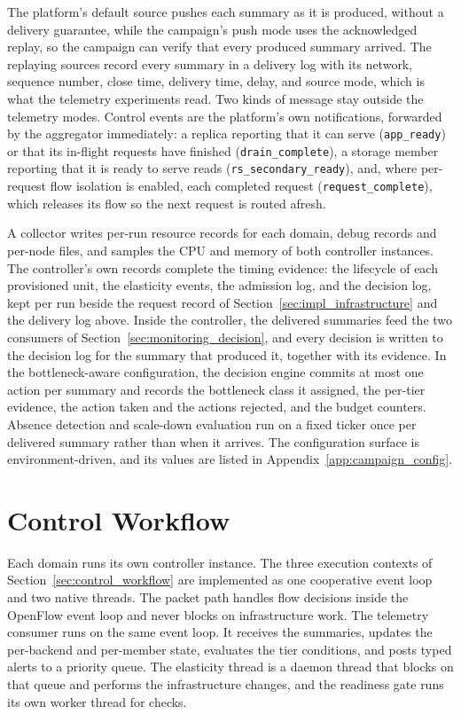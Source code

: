﻿\documentclass[12pt,reqno,twoside]{amsbook}
\begin{document}
The platform's default source pushes each summary as it is produced, without a
delivery guarantee, while the campaign's push mode uses the acknowledged replay,
so the campaign can verify that every produced summary arrived. The replaying
sources record every summary in a delivery log with its network, sequence number,
close time, delivery time, delay, and source mode, which is what the telemetry
experiments read. Two kinds of message stay outside the
telemetry modes. Control events are the platform's own notifications,
forwarded by the aggregator immediately: a replica reporting that it can
serve (\texttt{app\_ready}) or that its in-flight requests have finished
(\texttt{drain\_complete}), a storage member reporting that it is ready to
serve reads (\texttt{rs\_secondary\_ready}), and, where per-request flow
isolation is enabled, each completed request (\texttt{request\_complete}),
which releases its flow so the next request is routed afresh.

A collector writes per-run resource records for each domain, debug records and
per-node files, and samples the CPU and memory of both controller instances. The
controller's own records complete the timing evidence: the lifecycle of each
provisioned unit, the elasticity events, the admission log, and the decision log,
kept per run beside the request record of
Section~\ref{sec:impl_infrastructure} and the delivery log above. Inside the controller, the delivered
summaries feed the two consumers of
Section~\ref{sec:monitoring_decision}, and
every decision is written to the decision log for the summary that produced
it, together with its evidence. In the
bottleneck-aware configuration, the decision engine commits at most one
action per summary and records the bottleneck class it assigned, the
per-tier evidence, the action taken and the actions rejected, and the budget
counters. Absence
detection and scale-down evaluation run on a fixed ticker once per
delivered summary rather than when it arrives. The configuration surface
is environment-driven, and its values are listed in
Appendix~\ref{app:campaign_config}.

\section{Control Workflow}\label{sec:impl_control}

Each domain runs its own controller instance. The three execution
contexts of Section~\ref{sec:control_workflow} are implemented as one
cooperative event loop and two native threads. The packet path handles
flow decisions inside the OpenFlow event loop and never blocks on
infrastructure work. The telemetry consumer runs on the same event
loop. It receives the summaries, updates the per-backend and
per-member state, evaluates the tier conditions, and posts typed alerts
to a priority queue. The elasticity thread is a daemon thread that blocks
on that queue and performs the infrastructure changes, and the readiness
gate runs its own worker thread for checks.
\end{document}
